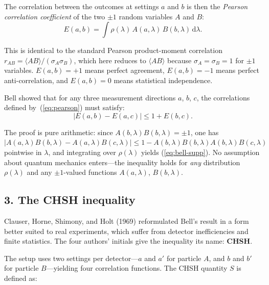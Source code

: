 The correlation between the outcomes at settings $a$ and $b$ is then the \textit{Pearson correlation coefficient} of the two $\pm1$ random variables $A$ and $B$:
\begin{equation}
  E(a,b) = \int \rho(\lambda)\, A(a,\lambda)\, B(b,\lambda)\, \mathrm{d}\lambda.
  \label{eq:pearson}
\end{equation}

This is identical to the standard Pearson product-moment correlation $r_{AB} = \langle AB \rangle / (\sigma_A \sigma_B)$, which here reduces to $\langle AB \rangle$ because $\sigma_A = \sigma_B = 1$ for $\pm1$ variables. $E(a,b) = +1$ means perfect agreement, $E(a,b) = -1$ means perfect anti-correlation, and $E(a,b) = 0$ means statistical independence.

\medskip

Bell showed that for any three measurement directions $a$, $b$, $c$, the correlations defined by~(\ref{eq:pearson}) must satisfy:
\begin{equation}
  |E(a,b) - E(a,c)| \leq 1 + E(b,c).
  \label{eq:bell-supp}
\end{equation}

The proof is pure arithmetic: since $A(b,\lambda)B(b,\lambda) = \pm1$, one has $|A(a,\lambda)B(b,\lambda) - A(a,\lambda)B(c,\lambda)| \leq 1 - A(b,\lambda)B(b,\lambda)A(b,\lambda)B(c,\lambda)$ pointwise in $\lambda$, and integrating over $\rho(\lambda)$ yields (\ref{eq:bell-supp}). No assumption about quantum mechanics enters---the inequality holds for \textit{any} distribution $\rho(\lambda)$ and any $\pm1$-valued functions $A(a,\lambda)$, $B(b,\lambda)$.

\subsection*{3. The CHSH inequality}

Clauser, Horne, Shimony, and Holt (1969) \cite{clauser_1969_chsh} reformulated Bell's result in a form better suited to real experiments, which suffer from detector inefficiencies and finite statistics. The four authors' initials give the inequality its name: \textbf{CHSH}.

\medskip

The setup uses two settings per detector---$a$ and $a'$ for particle $A$, and $b$ and $b'$ for particle $B$---yielding four correlation functions. The CHSH quantity $S$ is defined as:

